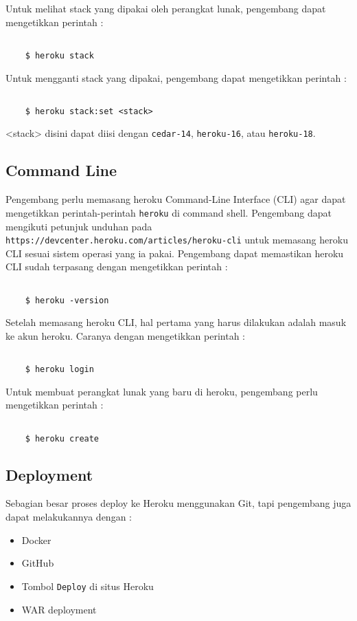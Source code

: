 Untuk melihat stack yang dipakai oleh perangkat lunak, pengembang dapat mengetikkan perintah :
\begin{lstlisting}

	$ heroku stack

\end{lstlisting}

Untuk mengganti stack yang dipakai, pengembang dapat mengetikkan perintah :
\begin{lstlisting}

	$ heroku stack:set <stack>

\end{lstlisting}
<stack> disini dapat diisi dengan \texttt{cedar-14}, \texttt{heroku-16}, atau \texttt{heroku-18}.

\subsection{Command Line}
Pengembang perlu memasang heroku Command-Line Interface (CLI) agar dapat mengetikkan perintah-perintah \texttt{heroku} di command shell. Pengembang dapat mengikuti petunjuk unduhan pada \texttt{https://devcenter.heroku.com/articles/heroku-cli} untuk memasang heroku CLI sesuai sistem operasi yang ia pakai. Pengembang dapat memastikan heroku CLI sudah terpasang dengan mengetikkan perintah :
\begin{lstlisting}

	$ heroku -version

\end{lstlisting}

Setelah memasang heroku CLI, hal pertama yang harus dilakukan adalah masuk ke akun heroku. Caranya dengan mengetikkan perintah :
\begin{lstlisting}

	$ heroku login

\end{lstlisting}

Untuk membuat perangkat lunak yang baru di heroku, pengembang perlu mengetikkan perintah :
\begin{lstlisting}

	$ heroku create

\end{lstlisting}

\subsection{Deployment}
Sebagian besar proses deploy ke Heroku menggunakan Git, tapi pengembang juga dapat melakukannya dengan :
\begin{itemize}
\item Docker
\item GitHub
\item Tombol \texttt{Deploy} di situs Heroku
\item WAR deployment
\end{itemize}

